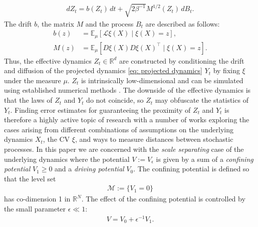 \documentclass[reqno, 12pt]{article}
\begin{document}
\begin{align}
    dZ_t = b(Z_t)\,dt + \sqrt{2\beta^{-1}}M^{1/2}(Z_t)\,dB_t. \label{eq: effective dynamics}
\end{align}
The drift $b$, the matrix $M$ and the process $B_t$ are described as follows:
\begin{align}
\label{eq: effective_b}
    b(z) &= \mathbb{E}_{\mu}[\mathcal{L}\xi(X) \mid \xi(X) = z], \\
\label{eq: effective_A}
    M(z) &= \mathbb{E}_{\mu}[D\xi(X)D\xi(X)^{\top} \mid \xi(X) = z].
\end{align}
Thus, the effective dynamics $Z_t \in \mathbb{R}^d$ are constructed by conditioning the drift and diffusion of the projected dynamics \eqref{eq: projected dynamics} $Y_t$ by fixing $\xi$ under the measure $\mu$. $Z_t$ is intrinsically low-dimensional and can be simulated using established numerical methods \cite{weinan2004metastability, maragliano2006string}. The downside of the effective dynamics is that the laws of $Z_t$ and $Y_t$ do not coincide, so $Z_t$ may obfuscate the statistics of $Y_t$. Finding error estimates for guaranteeing the proximity of $Z_t$ and $Y_t$ is therefore a highly active topic of research with a number of works \cite{legoll2010effective, legoll2019effective, lelievre2019pathwise, duong2018quantification, Sharma2017} exploring the cases arising from different combinations of assumptions on the underlying dynamics $X_t$, the CV $\xi$, and ways to measure distances between stochastic processes. In this paper we are concerned with the \emph{scale separating} case of the underlying dynamics where the potential $V:= V_\epsilon$ is given by a sum of a \emph{confining potential} $V_1\ge 0$ and a \emph{driving potential} $V_0$.
The confining potential is
defined so that the level set 
\begin{align}
 \mathcal{M} := \{V_1 = 0\}  \label{eq: residence manifold}
\end{align}
has co-dimension 1 in $\mathbb{R}^{N}$. The effect of the confining potential is controlled by the small parameter $\epsilon \ll 1$: 
\begin{align}
    V = V_0 + \epsilon^{-1}V_1. \label{eq: split potential} 
\end{align}
\end{document}
